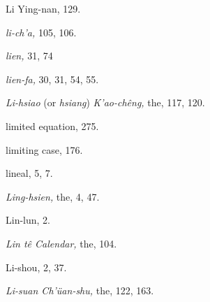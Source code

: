 \documentclass[11pt]{article}
\begin{document}
Li Ying-nan, 129.\par
\emph{li-ch'a,} 105, 106.\par
\emph{lien,} 31, 74\par
\emph{lien-fa,} 30, 31, 54, 55.\par
\emph{Li-hsiao} (or \emph{hsiang}) \emph{K'ao-chêng,} the, 117, 120.\par
limited equation, 275.\par
limiting case, 176.\par
lineal, 5, 7.\par
\emph{Ling-hsien,} the, 4, 47.\par
Lin-lun, 2.\par
\emph{Lin tê Calendar,} the, 104.\par
Li-shou, 2, 37.\par
\emph{Li-suan Ch'üan-shu,} the, 122, 163.\par
\end{document}
